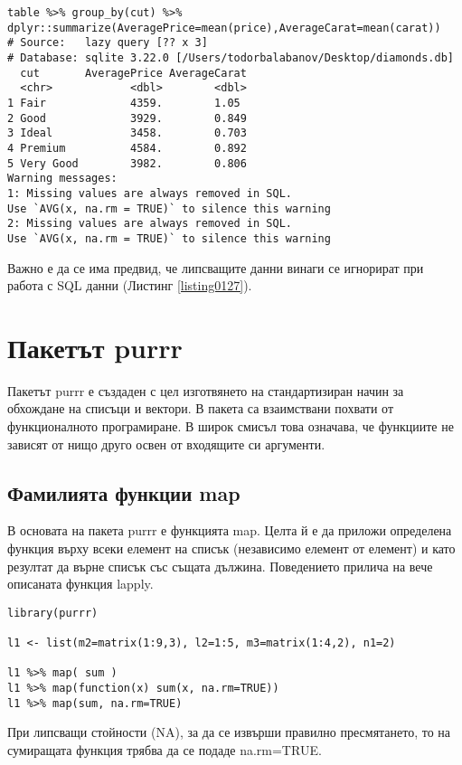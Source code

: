 \begin{lstlisting}[caption=Пресмятания с данни в база данни, label=listing0127]
table %>% group_by(cut) %>% dplyr::summarize(AveragePrice=mean(price),AverageCarat=mean(carat))
# Source:   lazy query [?? x 3]
# Database: sqlite 3.22.0 [/Users/todorbalabanov/Desktop/diamonds.db]
  cut       AveragePrice AverageCarat
  <chr>            <dbl>        <dbl>
1 Fair             4359.        1.05 
2 Good             3929.        0.849
3 Ideal            3458.        0.703
4 Premium          4584.        0.892
5 Very Good        3982.        0.806
Warning messages:
1: Missing values are always removed in SQL.
Use `AVG(x, na.rm = TRUE)` to silence this warning 
2: Missing values are always removed in SQL.
Use `AVG(x, na.rm = TRUE)` to silence this warning
\end{lstlisting}

Важно е да се има предвид, че липсващите данни винаги се игнорират при работа с SQL данни (Листинг \ref{listing0127}).

\section{Пакетът purrr}

Пакетът purrr е създаден с цел изготвянето на стандартизиран начин за обхождане на списъци и вектори. В пакета са взаимствани похвати от функционалното програмиране. В широк смисъл това означава, че функциите не зависят от нищо друго освен от входящите си аргументи. 

\subsection{Фамилията функции map}

В основата на пакета purrr е функцията map. Целта й е да приложи определена функция върху всеки елемент на списък (независимо елемент от елемент) и като резултат да върне списък със същата дължина. Поведението прилича на вече описаната функция lapply.

\begin{lstlisting}[caption=Прилагане на функцията map, label=listing0128]
library(purrr)

l1 <- list(m2=matrix(1:9,3), l2=1:5, m3=matrix(1:4,2), n1=2)

l1 %>% map( sum )
l1 %>% map(function(x) sum(x, na.rm=TRUE))
l1 %>% map(sum, na.rm=TRUE)
\end{lstlisting}

При липсващи стойности (NA), за да се извърши правилно пресмятането, то на сумиращата функция трябва да се подаде na.rm=TRUE. 

